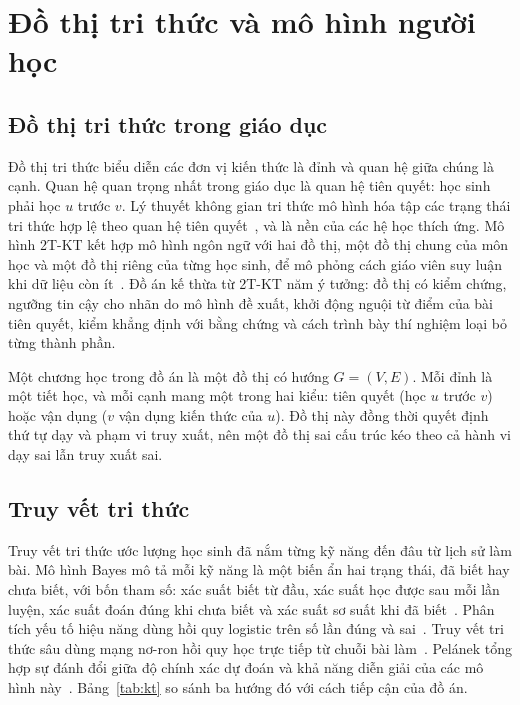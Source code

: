 \section{Đồ thị tri thức và mô hình người học}

\subsection{Đồ thị tri thức trong giáo dục}
Đồ thị tri thức biểu diễn các đơn vị kiến thức là đỉnh và quan hệ giữa chúng là cạnh. Quan hệ quan trọng nhất trong giáo dục là quan hệ tiên quyết: học sinh phải học $u$ trước $v$. Lý thuyết không gian tri thức mô hình hóa tập các trạng thái tri thức hợp lệ theo quan hệ tiên quyết~\cite{doignon1999}, và là nền của các hệ học thích ứng. Mô hình 2T-KT kết hợp mô hình ngôn ngữ với hai đồ thị, một đồ thị chung của môn học và một đồ thị riêng của từng học sinh, để mô phỏng cách giáo viên suy luận khi dữ liệu còn ít~\cite{li2026}. Đồ án kế thừa từ 2T-KT năm ý tưởng: đồ thị có kiểm chứng, ngưỡng tin cậy cho nhãn do mô hình đề xuất, khởi động nguội từ điểm của bài tiên quyết, kiểm khẳng định với bằng chứng và cách trình bày thí nghiệm loại bỏ từng thành phần.

Một chương học trong đồ án là một đồ thị có hướng $G=(V,E)$. Mỗi đỉnh là một tiết học, và mỗi cạnh mang một trong hai kiểu: tiên quyết (học $u$ trước $v$) hoặc vận dụng ($v$ vận dụng kiến thức của $u$). Đồ thị này đồng thời quyết định thứ tự dạy và phạm vi truy xuất, nên một đồ thị sai cấu trúc kéo theo cả hành vi dạy sai lẫn truy xuất sai.

\subsection{Truy vết tri thức}
Truy vết tri thức ước lượng học sinh đã nắm từng kỹ năng đến đâu từ lịch sử làm bài. Mô hình Bayes mô tả mỗi kỹ năng là một biến ẩn hai trạng thái, đã biết hay chưa biết, với bốn tham số: xác suất biết từ đầu, xác suất học được sau mỗi lần luyện, xác suất đoán đúng khi chưa biết và xác suất sơ suất khi đã biết~\cite{corbett1995}. Phân tích yếu tố hiệu năng dùng hồi quy logistic trên số lần đúng và sai~\cite{pavlik2009}. Truy vết tri thức sâu dùng mạng nơ-ron hồi quy học trực tiếp từ chuỗi bài làm~\cite{piech2015}. Pelánek tổng hợp sự đánh đổi giữa độ chính xác dự đoán và khả năng diễn giải của các mô hình này~\cite{pelanek2017}. Bảng~\ref{tab:kt} so sánh ba hướng đó với cách tiếp cận của đồ án.

